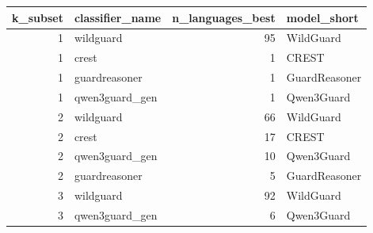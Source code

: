 \begin{tabular}{rlrl}
\toprule
k\_subset & classifier\_name & n\_languages\_best & model\_short \\
\midrule
1 & wildguard & 95 & WildGuard \\
1 & crest & 1 & CREST \\
1 & guardreasoner & 1 & GuardReasoner \\
1 & qwen3guard\_gen & 1 & Qwen3Guard \\
2 & wildguard & 66 & WildGuard \\
2 & crest & 17 & CREST \\
2 & qwen3guard\_gen & 10 & Qwen3Guard \\
2 & guardreasoner & 5 & GuardReasoner \\
3 & wildguard & 92 & WildGuard \\
3 & qwen3guard\_gen & 6 & Qwen3Guard \\
\bottomrule
\end{tabular}
